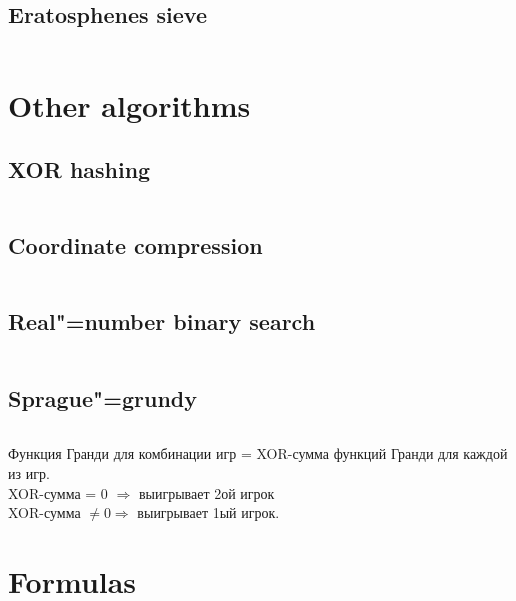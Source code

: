 ﻿\documentclass[10pt,twocolumn,oneside]{article}
\begin{document}
\subsection{Eratosphenes sieve}
\inputminted[breaklines]{cpp}{Maths/sieve.cpp}

\section{Other algorithms}
\subsection{XOR hashing}
\inputminted[breaklines]{cpp}{Other algorithms/xor-hashing.cpp}
\subsection{Coordinate compression}
\inputminted[breaklines]{cpp}{Other algorithms/coordinate compression.cpp}
\subsection{Real"=number binary search}
\inputminted[breaklines]{cpp}{Other algorithms/float binsearch.cpp}
\subsection{Sprague"=grundy}
\inputminted[breaklines]{cpp}{Other algorithms/sprague-grundy.cpp}
Функция Гранди для комбинации игр = XOR-сумма функций Гранди для каждой из игр.\\
XOR-сумма = 0 $\Rightarrow$ выигрывает 2ой игрок\\
XOR-сумма $\ne 0 \Rightarrow$ выигрывает 1ый игрок.\\

\section{Formulas}

\end{document}
